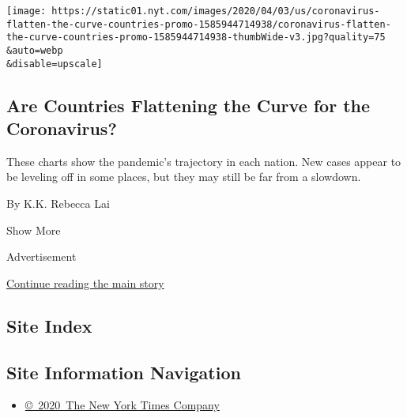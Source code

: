 \begin{enumerate}
  \texttt{[image: https://static01.nyt.com/images/2020/04/03/us/coronavirus-flatten-the-curve-countries-promo-1585944714938/coronavirus-flatten-the-curve-countries-promo-1585944714938-thumbWide-v3.jpg?quality=75\\\&auto=webp\\\&disable=upscale]}

  \hypertarget{are-countries-flattening-the-curve-for-the-coronavirus}{%
  \subsection{Are Countries Flattening the Curve for the
  Coronavirus?}\label{are-countries-flattening-the-curve-for-the-coronavirus}}

  These charts show the pandemic's trajectory in each nation. New cases
  appear to be leveling off in some places, but they may still be far
  from a slowdown.

  By K.K. Rebecca Lai
\end{enumerate}

Show More

Advertisement

\protect\hyperlink{after-mid2}{Continue reading the main story}

\hypertarget{site-index}{%
\subsection{Site Index}\label{site-index}}

\hypertarget{site-information-navigation}{%
\subsection{Site Information
Navigation}\label{site-information-navigation}}

\begin{itemize}
\tightlist
\item
  \href{https://help.nytimes.com/hc/en-us/articles/115014792127-Copyright-notice}{©~2020~The
  New York Times Company}
\end{itemize}

